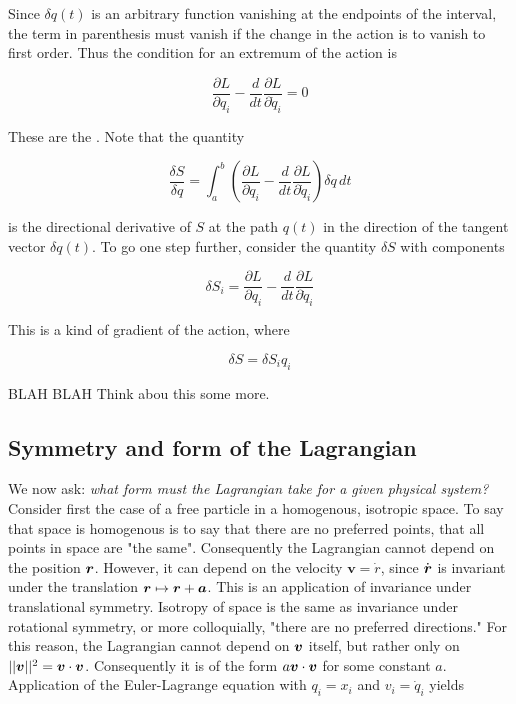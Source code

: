 Since $\delta q(t)$ is an arbitrary function vanishing at the endpoints of the interval, the term in parenthesis must vanish if the change in the action is to vanish to first order.  Thus the condition for an extremum of the action is

\begin{equation}
\label{eulerlagrangeequation}
\frac{\partial L}{\partial q_i}
 - \frac{d}{dt} \frac{\partial L}{\partial \dot q_i} = 0
\end{equation}

These are the .  Note that the quantity

\begin{equation}
\label{actionderivative|}
\frac{\delta S}{\delta q} =  \int_a^b\left(\frac{\partial L}{\partial q_i}
 - \frac{d}{dt} \frac{\partial L}{\partial \dot q_i}\right)\delta q\, dt 
\end{equation}

is the directional derivative of $S$ at the path $q(t)$ in the direction of the tangent vector $\delta q(t)$.  To go one step further, consider the quantity $\delta S$ with components

\begin{equation}
\label{actiondifferential}
\delta S_i =  \frac{\partial L}{\partial q_i}
 - \frac{d}{dt} \frac{\partial L}{\partial \dot q_i}
\end{equation}

This is a kind of gradient of the action, where

\begin{equation}
\delta S = \delta S_i q_i
\end{equation}

BLAH BLAH Think abou this some more.





\subsection{Symmetry and form of the Lagrangian}

We now ask: \emph{what form must the Lagrangian take for a given physical system?}  Consider first the case of a free particle in a homogenous, isotropic space.  To say that space is homogenous is to say that there are no preferred points, that all points in space are "the same".  Consequently the Lagrangian cannot depend on the position $\boldsymbol{r}$.  However, it can depend on the velocity $\boldsymbol{v} = \dot r $, since $\dot {\boldsymbol{r}}$ is invariant under the translation $\boldsymbol{r} \mapsto \boldsymbol{r} + \boldsymbol{a}$.  This is an application of invariance under translational symmetry.  Isotropy of space is the same as invariance under rotational symmetry, or more colloquially, "there are no preferred directions."  For this reason, the Lagrangian cannot depend on $\boldsymbol{v}$ itself, but rather only on $||\boldsymbol{v}||^2 = \boldsymbol{v}\cdot\boldsymbol{v}$.  Consequently it is of the form $a\boldsymbol{v}\cdot\boldsymbol{v}$ for some constant $a$. Application of the Euler-Lagrange equation with $q_i = x_i$ and $v_i  = \dot q_i$ yields

